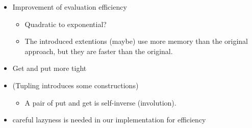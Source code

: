 \begin{itemize}
\item Improvement of evaluation efficiency
  \begin{itemize}
  \item Quadratic to exponential? 
  \item The introduced extentions (maybe) use more memory than the original approach, but they are faster than the original.
  \end{itemize}
\item Get and put more tight

\item (Tupling introduces some constructions)
  \begin{itemize}
  \item A pair of put and get is self-inverse (involution).
  \end{itemize}
\item careful lazyness is needed in our implementation for efficiency
  \end{itemize}

